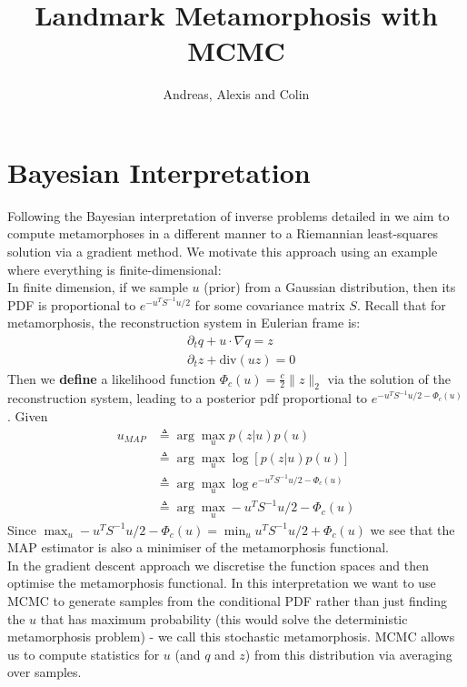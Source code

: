 \documentclass{article}
\newcommand{\norm}[2]{\| #1 \|_{ #2 }}
\newcommand{\ltwonorm}[1]{\norm{ #1 }{2}}
\begin{document}
\title{Landmark Metamorphosis with MCMC}
\author{Andreas, Alexis and Colin}
\maketitle

\section{Bayesian Interpretation}

Following the Bayesian interpretation of inverse problems detailed in
\cite{dashti2017bayesian} we aim to compute metamorphoses in a different manner
to a Riemannian least-squares solution via a gradient method. We motivate this
approach using an example where everything is finite-dimensional:\\
In finite dimension, if we sample $u$ (prior) from a Gaussian distribution,
then its PDF is proportional to $e^{-u^TS^{-1}u/2}$ for some covariance matrix
$S$. Recall that for metamorphosis, the reconstruction system in Eulerian frame
is:
\begin{align*}
& \partial_t q + u\cdot\nabla q = z\\
& \partial_t z + \text{div}(u z) = 0
\end{align*}
Then we \textbf{define} a likelihood function $\Phi_c(u)=\frac c2\ltwonorm{z}$
via the solution of the reconstruction system, leading to a posterior pdf
proportional to $e^{-u^TS^{-1}u/2 - \Phi_c(u)}$. 
Given
\begin{align*}
u_{MAP} & \triangleq \arg\max_u p(z|u)p(u)\\
        & \triangleq \arg\max_u \log [ p(z|u)p(u)]\\
        & \triangleq \arg\max_u \log e^{-u^TS^{-1}u/2 - \Phi_c(u)}\\
        & \triangleq \arg\max_u - u^TS^{-1}u/2 - \Phi_c(u)
\end{align*}
Since $\max_u - u^TS^{-1}u/2 - \Phi_c(u)= \min_u u^TS^{-1}u/2 + \Phi_c(u)$ we
see that the MAP estimator is also a minimiser of the metamorphosis
functional.\\

In the gradient descent approach we discretise the function spaces and then
optimise the metamorphosis functional. In this interpretation we want to use
MCMC to generate samples from the conditional PDF rather than just finding the
$u$ that has maximum probability (this would solve the deterministic
metamorphosis problem) - we call this stochastic metamorphosis. MCMC allows us
to compute statistics for $u$ (and $q$ and $z$) from this distribution via
averaging over samples.
\end{document}
